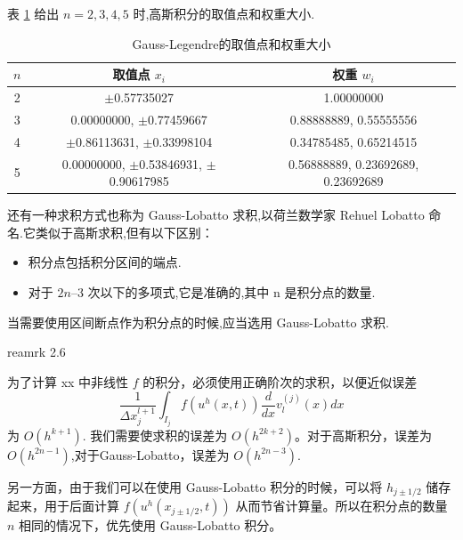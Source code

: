 \documentclass{book}
\begin{document}
表 \ref{tab:Gauss-Legendre积分} 给出 $n=2,3,4,5$ 时,高斯积分的取值点和权重大小.
\begin{table}[ht]
    \centering
    \caption{Gauss-Legendre的取值点和权重大小}
    \label{tab:Gauss-Legendre积分}
    \begin{tabular}{ccc}
        \toprule
        $n$ & 取值点 $x_i$                                 & 权重 $w_i$                         \\
        \midrule
        2   & $\pm$0.57735027                              & 1.00000000                         \\
        3   & 0.00000000, $\pm$0.77459667                  & 0.88888889, 0.55555556             \\
        4   & $\pm$0.86113631, $\pm$0.33998104             & 0.34785485, 0.65214515             \\
        5   & 0.00000000, $\pm$0.53846931, $\pm$0.90617985 & 0.56888889, 0.23692689, 0.23692689 \\
        \bottomrule
    \end{tabular}
\end{table}


还有一种求积方式也称为 Gauss-Lobatto 求积,以荷兰数学家 Rehuel Lobatto 命名.它类似于高斯求积,但有以下区别：
\begin{itemize}
    \item 积分点包括积分区间的端点.
    \item 对于 $2n – 3$ 次以下的多项式,它是准确的,其中 n 是积分点的数量.
\end{itemize}
当需要使用区间断点作为积分点的时候,应当选用 Gauss-Lobatto 求积.


\cite{RKDG2} reamrk 2.6


为了计算 xx 中非线性 $f$ 的积分，必须使用正确阶次的求积，以便近似误差
\begin{equation}
    \frac{1}{\Delta x_{j}^{l+1}} \int_{I_{j}} f\left(u^{h}(x, t)\right) \frac{d}{d x} v_{l}^{(j)}(x) d x
\end{equation}
为 $O\left(h^{k+1}\right)$. 我们需要使求积的误差为 $O\left(h^{2 k+2}\right)$。对于高斯积分，误差为 $O\left(h^{2n-1}\right)$,对于Gauss-Lobatto，误差为 $O\left(h^{2n-3}\right)$.

另一方面，由于我们可以在使用 Gauss-Lobatto 积分的时候，可以将 $h_{j \pm 1 / 2}$  储存起来，用于后面计算  $f\left(u^{h}\left(x_{j \pm 1 / 2}, t\right)\right)$ 从而节省计算量。所以在积分点的数量 $n$ 相同的情况下，优先使用  Gauss-Lobatto 积分。
\end{document}
